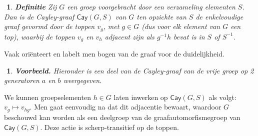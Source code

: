 \documentclass[12pt]{book}
\newtheorem{vbh}[stelh]{$\!\!$}
\newenvironment{vb}{\begin{vbh} \em {\bf Voorbeeld.} }{\end{vbh}}
\newtheorem{dfh}[stelh]{$\!\!$}
\newenvironment{df}{\begin{dfh} \em {\bf Definitie }}{\end{dfh}}
\begin{document}
\begin{df}
Zij $G$ een groep voorgebracht door een verzameling elementen $S$. Dan is de \emph{Cayley-graaf} $\mathsf{Cay}(G,S)$ van $G$ ten opzichte van $S$ de enkelvoudige graaf gevormd door de toppen $v_g$, met $g \in G$ (dus voor elk element van $G$ een top), waarbij de toppen $v_g$ en $v_h$ adjacent zijn als $g^{-1}h$ bevat is in $S$ of $S^{-1}$. 
\end{df}

Vaak ori\"enteert en labelt men bogen van de graaf voor de duidelijkheid. 

\begin{vb}
Hieronder is een deel van de Cayley-graaf van de vrije groep op 2 generatoren $a$ en $b$ weergegeven.

\begin{center}
\end{center}
\end{vb}


We kunnen groepselementen $h \in G$ laten inwerken op $\mathsf{Cay}(G,S)$ als volgt: $v_g \mapsto v_{hg}$. Men gaat eenvoudig na dat dit adjacentie bewaart, waardoor $G$ beschouwd kan worden als een deelgroep van de graafautomorfismegroep van $\mathsf{Cay}(G,S)$. Deze actie is scherp-transitief op de toppen.
\end{document}
